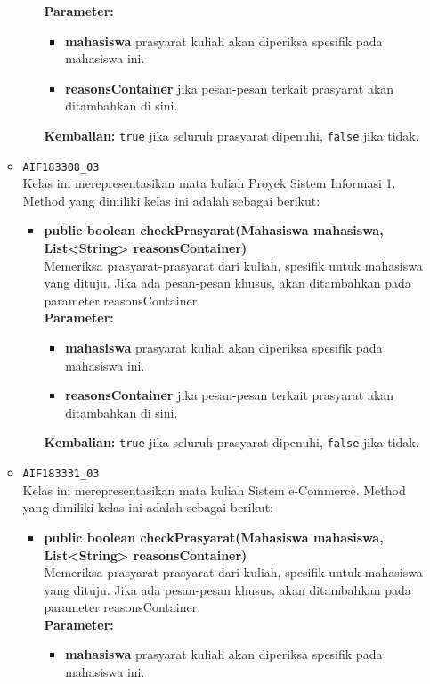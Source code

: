 \begin{enumerate}
\begin{itemize}
\begin{itemize}
			\textbf{Parameter:}
			\begin{itemize}
				\item \textbf{mahasiswa} prasyarat kuliah akan diperiksa spesifik pada mahasiswa ini.
				\item \textbf{reasonsContainer} jika pesan-pesan terkait prasyarat akan ditambahkan di sini.
			\end{itemize}
			\textbf{Kembalian:} \texttt{true} jika seluruh prasyarat dipenuhi, \texttt{false} jika tidak.
		\end{itemize}
		\item \texttt{AIF183308\_03} \\
		Kelas ini merepresentasikan mata kuliah Proyek Sistem Informasi 1. Method yang dimiliki kelas ini adalah sebagai berikut: 
		\begin{itemize}
			\item \textbf{public boolean checkPrasyarat(Mahasiswa mahasiswa, List<String> reasonsContainer)}\\
			Memeriksa prasyarat-prasyarat dari kuliah, spesifik untuk mahasiswa yang dituju. Jika ada pesan-pesan khusus, akan ditambahkan pada parameter reasonsContainer.\\
			\textbf{Parameter:}
			\begin{itemize}
				\item \textbf{mahasiswa} prasyarat kuliah akan diperiksa spesifik pada mahasiswa ini.
				\item \textbf{reasonsContainer} jika pesan-pesan terkait prasyarat akan ditambahkan di sini.
			\end{itemize}
			\textbf{Kembalian:} \texttt{true} jika seluruh prasyarat dipenuhi, \texttt{false} jika tidak.
		\end{itemize}
		\item \texttt{AIF183331\_03} \\
		Kelas ini merepresentasikan mata kuliah Sistem e-Commerce. Method yang dimiliki kelas ini adalah sebagai berikut: 
		\begin{itemize}
			\item \textbf{public boolean checkPrasyarat(Mahasiswa mahasiswa, List<String> reasonsContainer)}\\
			Memeriksa prasyarat-prasyarat dari kuliah, spesifik untuk mahasiswa yang dituju. Jika ada pesan-pesan khusus, akan ditambahkan pada parameter reasonsContainer.\\
			\textbf{Parameter:}
			\begin{itemize}
				\item \textbf{mahasiswa} prasyarat kuliah akan diperiksa spesifik pada mahasiswa ini.

\end{itemize}
\end{itemize}
\end{itemize}
\end{enumerate}
